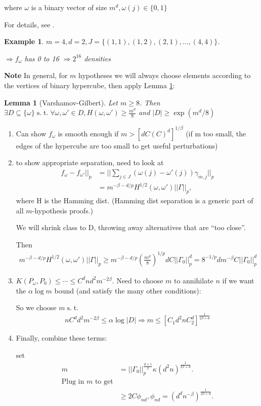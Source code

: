 \documentclass[10pt]{article}
\newtheorem{lemma}[lemma]{Lemma}
\newtheorem{example}[ex]{Example}
\newcommand{\st}{\ensuremath{\;\mathrm{s.}\;\mathrm{t.}\;}}
\begin{document}
where $\omega$ is a binary vector of size $m^d, \omega(j)\in\{0,1\}$

For details, see \cite{McDonald2017}.
\begin{example}
$m=4,d=2,J=\{(1,1),(1,2),(2,1),...,(4,4)\}$.

$\Rightarrow f_\omega$ has 0 to 16 $\Rightarrow 2^{16}$ densities

\end{example}


\textbf{Note}
In general, for $m$ hypotheses we will always choose elements according to the vertices of binary hypercube, then apply Lemma \ref{vg}:
\begin{lemma}[Varshamov-Gilbert]
\label{vg}
Let $m\geq 8$.  Then $\exists D\subseteq \{\omega\} \st \forall \omega,\omega'\in D,
H(\omega,\omega')\geq \frac{m^d}{8}$ and
$|D|\geq\exp(m^d/8)$
\end{lemma}

\begin{enumerate}
\item Can show $f_\omega$ is smooth enough if $m>\left[dC(C)^d\right]^{1/\beta}$
(if m too small, the edges of the hypercube are too small to get useful perturbations)
\item to show appropriate separation, need to look at 
\begin{align*}
f_\omega-f_{\omega'}||_p &= ||\sum_{j\in J}(\omega(j) - \omega'(j))\gamma_{m,j}||_p\\
&= m^{-\beta-d/p}H^{1/2}(\omega,\omega')||\Gamma||_p,
\end{align*}
where H is the Hamming dist.
(Hamming dist separation is a generic part of all $m$-hypothesis proofs.)

We will shrink class to D, throwing away alternatives that are ``too close''.

Then 
\begin{align*}
m^{-\beta-d/p}H^{1/2}(\omega,\omega')||\Gamma||_p 
	\geq m^{-\beta-d/p} (\frac{m^d}{8})^{1/p} dC||\Gamma_0||_p^d
	= 8^{-1/p}dm^{-\beta}C||\Gamma_0||_p^d
\end{align*}

\item $K(P_\omega,P_0)\leq\cdots\leq C^dnd^2m^{-2\beta}$.  
Need to choose $m$ to annihilate $n$ if we want the $\alpha\log m$ bound (and satisfy the many other conditions):

So we choose $m \st$
\[ nC^dd^2m^{-2\beta}\leq \alpha\log |D|
\Rightarrow m\leq \left[C_1d^2nC_2^d\right]^{\frac{1}{2\beta+d}}\]

\item Finally, combine these terms: 

set 
\begin{align*}
m&=||\Gamma_0||_p^{\frac{d+1}{\beta}}\kappa(d^2n)^{\frac{1}{2\beta+d}}.\\
\text{Plug in $m$ to get}\\
& \geq 2C\phi_{nd}, \phi_{nd}=(d^dn^{-\beta})^{\frac{1}{2\beta+d}}.
\end{align*}


\end{enumerate}
	


\end{document}
